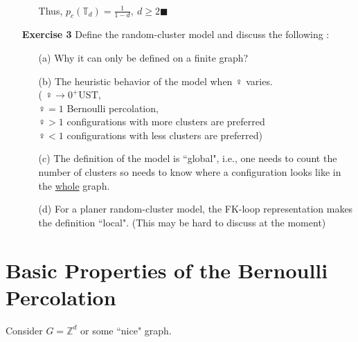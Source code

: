 \documentclass[12pt,a4paper]{report}
\theoremstyle{definition}
\begin{document}
\begin{flushleft}
\begin{enumerate}
\begin{enumerate}
\begin{align*}
	\end{align*}
	Thus, $p_c(\mathbb{T}_d)=\frac{1}{1-d},\ d\geq 2$\qquad $\blacksquare$
	\end{enumerate}
	\item[\textbf{Exercise 3}] Define the random-cluster model and discuss the following :
	\begin{enumerate}
	    \item[(a)] Why it can only be defined on a finite graph?
	    \item[(b)] The heuristic behavior of the model when $\female$ varies.\\
	    ( $\female\to 0^+$\quad UST,\\ $\female=1$ Bernoulli percolation, \\
	    $\female>1$ configurations with more clusters are preferred\\
	    $\female<1$ configurations with less clusters are preferred)
	    \item[(c)] The definition of the model is ``global", i.e., one needs to count the number of clusters so needs to know where a configuration looks like in the \underline{whole} graph.
	    \item[(d)] For a planer random-cluster model, the FK-loop representation makes the definition ``local". (This may be hard to discuss at the moment)
	\end{enumerate}
\end{enumerate}
\end{flushleft}
\newpage
\chapter{Basic Properties of the Bernoulli Percolation}
\begin{flushleft}
	Consider $G=\mathbb{Z}^d$ or some ``nice" graph.\\[1cm]
\end{flushleft}
\end{document}
